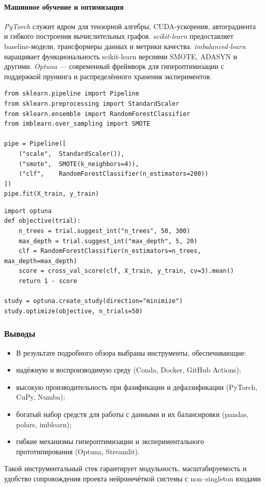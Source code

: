 \paragraph{Машинное обучение и оптимизация}

\emph{PyTorch} служит ядром для тензорной алгебры, CUDA-ускорения,
автоградиента и гибкого построения вычислительных графов.
\emph{scikit-learn} предоставляет baseline-модели, трансформеры данных
и метрики качества.  
\emph{imbalanced-learn} наращивает функциональность scikit-learn 
версиями SMOTE, ADASYN и другими.  
\emph{Optuna} — современный фреймворк для гипероптимизации
с поддержкой прунинга и распределённого хранения экспериментов.


\begin{center}
  \medskip
  \begin{verbatim}
from sklearn.pipeline import Pipeline
from sklearn.preprocessing import StandardScaler
from sklearn.ensemble import RandomForestClassifier
from imblearn.over_sampling import SMOTE

pipe = Pipeline([
    ("scale",  StandardScaler()),
    ("smote",  SMOTE(k_neighbors=4)),
    ("clf",    RandomForestClassifier(n_estimators=200))
])
pipe.fit(X_train, y_train)
  \end{verbatim}
\end{center}

\begin{center}
  \medskip
  \begin{verbatim}
import optuna
def objective(trial):
    n_trees = trial.suggest_int("n_trees", 50, 300)
    max_depth = trial.suggest_int("max_depth", 5, 20)
    clf = RandomForestClassifier(n_estimators=n_trees, max_depth=max_depth)
    score = cross_val_score(clf, X_train, y_train, cv=3).mean()
    return 1 - score

study = optuna.create_study(direction="minimize")
study.optimize(objective, n_trials=50)
  \end{verbatim}
\end{center}

\subsubsection{Выводы}
\label{subsubsec:tool_summary}
\begin{itemize}
  \item[] В результате подробного обзора выбраны инструменты,
обеспечивающие:
  \item надёжную и воспроизводимую среду (Conda, Docker, GitHub Actions);
  \item высокую производительность при фазификации и дефаззификации
        (PyTorch, CuPy, Numba);
  \item богатый набор средств для работы с данными и их балансировки
        (pandas, polars, imblearn);
  \item гибкие механизмы гипероптимизации и экспериментального
        прототипирования (Optuna, Streamlit).
\end{itemize}

Такой инструментальный стек гарантирует модульность, масштабируемость
и удобство сопровождения проекта нейронечёткой системы
с non–singleton входами
